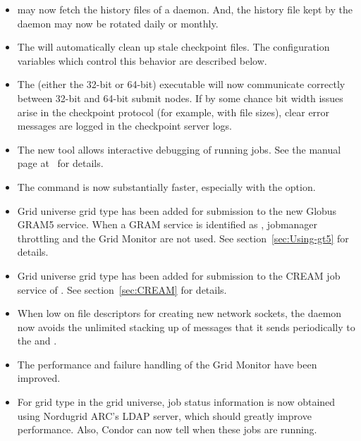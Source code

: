 \begin{itemize}

\item {} may now fetch the history files of a 
daemon.  And, the history file kept by the  daemon may
now be rotated daily or monthly.

\item The  will automatically clean up stale
checkpoint files. The configuration variables which control this
behavior are described below.

\item The  (either the 32-bit or 64-bit) executable
will now communicate correctly between 32-bit and 64-bit submit nodes.
If by some chance bit width issues arise in the checkpoint protocol
(for example, with file sizes),
clear error messages are logged in the checkpoint server logs.

\item The new  tool allows interactive debugging of running
jobs.  See the manual page at~\pageref{man-condor-ssh-to-job} for details.

\item The  command is now substantially faster, 
especially with the  option.

\item Grid universe grid type  has been added for submission to
the new Globus GRAM5 service. When a GRAM service is identified as
, jobmanager throttling and the Grid Monitor are not used.
See section~\ref{sec:Using-gt5} for details.

\item Grid universe grid type  has been added for submission
to the CREAM job service of .
See section~\ref{sec:CREAM} for details.

\item When low on file descriptors for creating new network sockets,
the  daemon now avoids the unlimited stacking up of
messages that it sends periodically to the  
and .

\item The performance and failure handling of the Grid Monitor have been
improved.

\item For grid type  in the grid universe,
job status information
is now obtained using Nordugrid ARC's LDAP server, which should greatly
improve performance. Also, Condor can now tell when these jobs are running.


\end{itemize}
